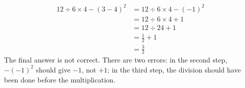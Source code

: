 {\begin{equation*}
	\begin{split}
		12 \div 6 \times 4 - (3-4)^2 &= 12 \div 6 \times 4 - (-1)^2 \\
					     &= 12 \div 6 \times 4 +1 \\
					     &= 12 \div 24 + 1 \\
					     &= \frac{1}{2} + 1 \\
					     &= \frac{3}{2}
	\end{split}
\end{equation*} }
{The final answer is not correct. There are two errors: in the second step, $-(-1)^2$ should give $-1$, not $+1$; in the third step, the division should have been done before the multiplication.}
